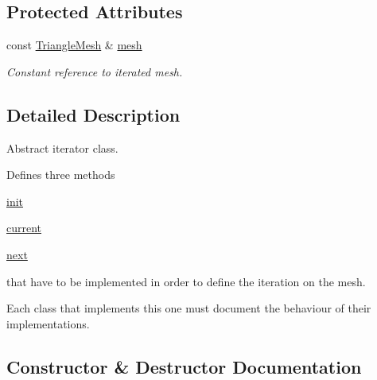 \subsection*{Protected Attributes}
\begin{DoxyCompactItemize}
\item 
\mbox{\label{classgeoproc_1_1iterators_1_1mesh__iterator_a6102e0c43bcf7008597387a2f085ca0e}} 
const \hyperlink{classgeoproc_1_1TriangleMesh}{Triangle\+Mesh} \& \hyperlink{classgeoproc_1_1iterators_1_1mesh__iterator_a6102e0c43bcf7008597387a2f085ca0e}{mesh}
\begin{DoxyCompactList}\small\item\em Constant reference to iterated mesh. \end{DoxyCompactList}\end{DoxyCompactItemize}


\subsection{Detailed Description}
Abstract iterator class. 

Defines three methods
\begin{DoxyItemize}
\item \hyperlink{classgeoproc_1_1iterators_1_1mesh__iterator_a8a4d8b5c84941dd0a7cb7373abcd3fcc}{init}
\item \hyperlink{classgeoproc_1_1iterators_1_1mesh__iterator_ae6151b065602980d37a582977083ef42}{current}
\item \hyperlink{classgeoproc_1_1iterators_1_1mesh__iterator_a32f1ddc2f83743a2b0a4633506601cfe}{next}
\end{DoxyItemize}

that have to be implemented in order to define the iteration on the mesh.

Each class that implements this one must document the behaviour of their implementations. 

\subsection{Constructor \& Destructor Documentation}
\mbox{\label{classgeoproc_1_1iterators_1_1mesh__iterator_a785c3bccc57fd4db49de8aa89bc2d04e}} 
